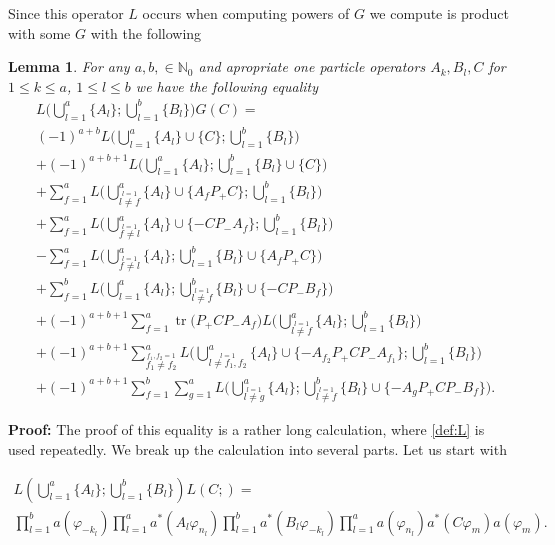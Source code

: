 \documentclass[b5paper,draft,openbib,12pt]{memoir}
\newtheorem{Lemma}[Def]{Lemma}
\DeclareMathOperator{\tr}{tr}
\begin{document}
Since this operator \(L\) occurs when computing powers of \(G\) we compute is product with some \(G\) with 
the following 

\begin{Lemma}\label{lem:Ntimes1} For any \(a,b,\in\mathbb{N}_0\) and apropriate one particle operators \(A_k, B_l, C\) for \(1\le k\le a\), \(1\le l\le b\) we have the following equality
\begin{align}
&L\Big(\bigcup_{l=1}^a \{A_l\}; \bigcup_{l=1}^b \{B_l\}\Big)G(C) =\\\label{Ntimes1:simplyAdd1}
 &(-1)^{a+b} L\Big(\bigcup_{l=1}^a \{A_l\}\cup \{C\}; \bigcup_{l=1}^b \{B_l\}\Big) \\\label{Ntimes1:simplyAdd2}
 &+(-1)^{a+b+1} L\Big(\bigcup_{l=1}^a \{A_l\}; \bigcup_{l=1}^b \{B_l\}\cup \{C\} \Big) \\\label{Ntimes1:n+1atEnd1}
&+ \sum_{f=1}^a  L\Big(\bigcup_{\stackrel{l=1}{l\neq f}}^a \{A_l\}\cup \{A_fP_+C \}; \bigcup_{l=1}^b \{B_l\}\Big) \\\label{Ntimes1:n+1atBeginning1}
&+\sum_{f=1}^a
 L\Big(\bigcup_{\stackrel{l=1}{f\neq l}}^a \{A_l\}\cup \{- CP_- A_f\}; \bigcup_{l=1}^b \{B_l\}\Big)\\\label{Ntimes1:n+1atEnd2}
& -\sum_{f=1}^a L\Big(\bigcup_{\stackrel{l=1}{f\neq l}}^a \{A_l\}; \bigcup_{l=1}^b \{B_l\}\cup \{A_f P_+ C\}\Big)\\\label{Ntimes1:n+1atBeginning2}
&+ \sum_{f=1}^b L\Big(\bigcup_{l=1}^a \{A_l\}; \bigcup_{\stackrel{l=1}{l\neq f}}^b \{B_l\}\cup \{-CP_- B_f\}\Big)\\\label{Ntimes1:TrTerm}
&+ (-1)^{a+b+1} \sum_{f=1}^a \tr \Big(P_+ C P_- A_f\Big) L\Big(\bigcup_{\stackrel{l=1}{l \neq f}}^a \{A_l\}; \bigcup_{l=1}^b \{B_l\}\Big)\\\label{Ntimes1:middle1}
&+ (-1)^{a+b+1} \sum_{\stackrel{f_1,f_2=1}{f_1\neq f_2}}^a L\Big(\bigcup_{\stackrel{l=1}{l\neq f_1,f_2}}^a \{A_l\}\cup \{-A_{f_2} P_+ C P_- A_{f_1}\}; \bigcup_{l=1}^b \{B_l\}\Big)\\\label{Ntimes1:middle2}
&+(-1)^{a+b+1} \sum_{f=1}^b \sum_{g=1}^a L\Big(\bigcup_{\stackrel{l=1}{l\neq g}}^a \{A_l\}; \bigcup_{\stackrel{l=1}{l\neq f}}^b \{B_l\}\cup \{-A_g P_+ C P_- B_f\}\Big).
\end{align}
\end{Lemma}
{\bfseries Proof:}  The proof of this equality is a rather long calculation, where \eqref{def:L} is used repeatedly. We break up the calculation into 
several parts. Let us start with

\begin{multline}
L\left(\bigcup_{l=1}^a \{A_l\}; \bigcup_{l=1}^b \{B_l\}\right) L(C;)=\\
\prod_{l=1}^b a(\varphi_{-k_l}) \prod_{l=1}^a a^*(A_l \varphi_{n_l}) \prod_{l=1}^b a^*(B_l \varphi_{-k_l}) \prod_{l=1}^a a(\varphi_{n_l}) a^*(C \varphi_m) a(\varphi_m).
\end{multline}
\end{document}
